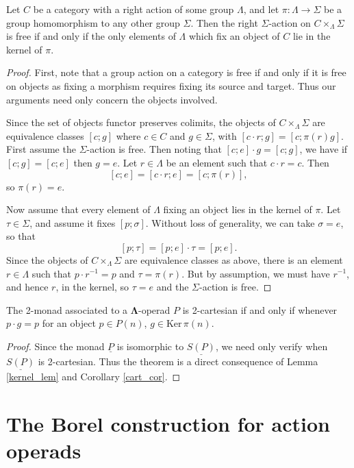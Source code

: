 \documentclass{amsbook} %
\newcommand{\ML}{\mathbf{\Lambda}}
\numberwithin{section}{chapter}
\begin{document}
\begin{lem}\label{kernel_lem}
Let $C$ be a category with a right action of some group $\Lambda$, and let $\pi \colon  \Lambda \to \Sigma$ be a group homomorphism to any other group $\Sigma$.  Then the right $\Sigma$-action on $C \times_{\Lambda} \Sigma$ is free if and only if the only elements of $\Lambda$ which fix an object of $C$ lie in the kernel of $\pi$.
\end{lem}
\begin{proof}
First, note that a group action on a category is free if and only if it is free on objects as fixing a morphism requires fixing its source and target.  Thus our arguments need only concern the objects involved.

Since the set of objects functor preserves colimits, the objects of $C \times_{\Lambda} \Sigma$ are equivalence classes $[c;g]$ where $c \in C$ and $g \in \Sigma$, with $[c\cdot r;g] = [c; \pi(r)g]$.  First assume the $\Sigma$-action is free.  Then noting that $[c;e]\cdot g =[c;g]$, we have if $[c;g] = [c;e]$ then $g=e$.  Let $r \in \Lambda$ be an element such that $c\cdot r = c$.  Then
\[
[c;e] = [c\cdot r; e] = [c; \pi(r)],
\]
so $\pi(r) = e$.

Now assume that every element of $\Lambda$ fixing an object lies in the kernel of $\pi$.  Let $\tau \in \Sigma$, and assume it fixes $[p; \sigma]$.  Without loss of generality, we can take $\sigma = e$, so that
\[
[p; \tau] = [p;e]\cdot \tau = [p;e].
\]
Since the objects of $C \times_{\Lambda} \Sigma$ are equivalence classes as above, there is an element $r \in \Lambda$ such that $p\cdot r^{-1} = p$ and $\tau = \pi(r)$.  But by assumption, we must have $r^{-1}$, and hence $r$, in the kernel, so $\tau = e$ and the $\Sigma$-action is free.
\end{proof}

\begin{thm}\label{cart_thm}
The 2-monad associated to a $\ML$-operad $P$ is 2-cartesian if and only if whenever $p \cdot g = p$ for an object $p \in P(n)$, $g \in \textrm{Ker} \, \pi (n)$.
\end{thm}
\begin{proof}
Since the monad $\underline{P}$ is isomorphic to $\underline{S(P)}$, we need only verify when $\underline{S(P)}$ is 2-cartesian.  Thus the theorem is a direct consequence of Lemma \ref{kernel_lem} and Corollary \ref{cart_cor}.
\end{proof}

\section{The Borel construction for action operads}
\end{document}
